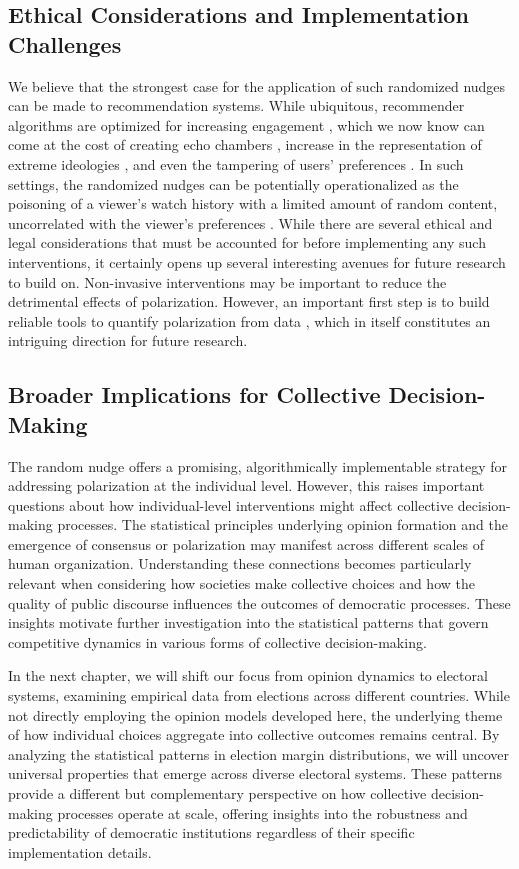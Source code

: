 \subsection{Ethical Considerations and Implementation Challenges}
We believe that the strongest case for the application of such randomized nudges can be made to recommendation systems. While ubiquitous, recommender algorithms are optimized for increasing engagement \cite{recommender-systems-and-their-ethical-challenges}, which we now know can come at the cost of creating echo chambers \cite{echo-chambers-in-collaborative-filtering-based-recommendation-systems}, increase in the representation of extreme ideologies \cite{recommender-systems-and-the-amplification-of-extremist-content}, and even the tampering of users' preferences \cite{user-tampering}. In such settings, the randomized nudges can be potentially operationalized as the poisoning of a viewer's watch history with a limited amount of random content, uncorrelated with the viewer's preferences \cite{youtube-audit}. While there are several ethical and legal considerations that must be accounted for before implementing any such interventions, it certainly opens up several interesting avenues for future research to build on. Non-invasive interventions may be important to reduce the detrimental effects of polarization. However, an important first step is to build reliable tools to quantify polarization from data \cite{hohmann2023quantifying}, which in itself constitutes an intriguing direction for future research.
\subsection{Broader Implications for Collective Decision-Making}
The random nudge offers a promising, algorithmically implementable strategy for addressing polarization at the individual level. However, this raises important questions about how individual-level interventions might affect collective decision-making processes. The statistical principles underlying opinion formation and the emergence of consensus or polarization may manifest across different scales of human organization. Understanding these connections becomes particularly relevant when considering how societies make collective choices and how the quality of public discourse influences the outcomes of democratic processes. These insights motivate further investigation into the statistical patterns that govern competitive dynamics in various forms of collective decision-making. 

In the next chapter, we will shift our focus from opinion dynamics to electoral systems, examining empirical data from elections across different countries. While not directly employing the opinion models developed here, the underlying theme of how individual choices aggregate into collective outcomes remains central. By analyzing the statistical patterns in election margin distributions, we will uncover universal properties that emerge across diverse electoral systems. These patterns provide a different but complementary perspective on how collective decision-making processes operate at scale, offering insights into the robustness and predictability of democratic institutions regardless of their specific implementation details. 